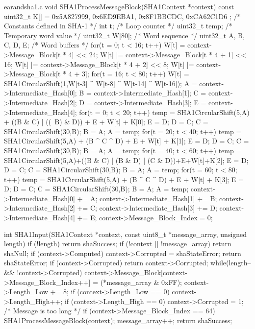 \begin{chunk}{earandsha1.c}
void SHA1ProcessMessageBlock(SHA1Context *context) {
  const uint32_t K[] = { 0x5A827999, 0x6ED9EBA1, 0x8F1BBCDC, 0xCA62C1D6 };
                              /* Constants defined in SHA-1  */
  int t;                      /* Loop counter                */
  uint32_t temp;              /* Temporary word value        */
  uint32_t W[80];             /* Word sequence               */
  uint32_t A, B, C, D, E;     /* Word buffers                */
  for(t = 0; t < 16; t++) {
    W[t] = context->Message_Block[t * 4] << 24;
    W[t] |= context->Message_Block[t * 4 + 1] << 16;
    W[t] |= context->Message_Block[t * 4 + 2] << 8;
    W[t] |= context->Message_Block[t * 4 + 3];
  }
  for(t = 16; t < 80; t++) {
    W[t] = SHA1CircularShift(1,W[t-3] ^ W[t-8] ^ W[t-14] ^ W[t-16]);
  }
  A = context->Intermediate_Hash[0];
  B = context->Intermediate_Hash[1];
  C = context->Intermediate_Hash[2];
  D = context->Intermediate_Hash[3];
  E = context->Intermediate_Hash[4];
  for(t = 0; t < 20; t++) {
    temp =  SHA1CircularShift(5,A) + ((B & C) | ((~B) & D)) + E + W[t] + K[0];
    E = D;
    D = C;
    C = SHA1CircularShift(30,B);
    B = A;
    A = temp;
  }
  for(t = 20; t < 40; t++) {
    temp = SHA1CircularShift(5,A) + (B ^ C ^ D) + E + W[t] + K[1];
    E = D;
    D = C;
    C = SHA1CircularShift(30,B);
    B = A;
    A = temp;
  }
  for(t = 40; t < 60; t++) {
    temp = SHA1CircularShift(5,A)+((B & C) | (B & D) | (C & D))+E+W[t]+K[2];
    E = D;
    D = C;
    C = SHA1CircularShift(30,B);
    B = A;
    A = temp;
  }
  for(t = 60; t < 80; t++) {
    temp = SHA1CircularShift(5,A) + (B ^ C ^ D) + E + W[t] + K[3];
    E = D;
    D = C;
    C = SHA1CircularShift(30,B);
    B = A;
    A = temp;
  }
  context->Intermediate_Hash[0] += A;
  context->Intermediate_Hash[1] += B;
  context->Intermediate_Hash[2] += C;
  context->Intermediate_Hash[3] += D;
  context->Intermediate_Hash[4] += E;
  context->Message_Block_Index = 0;
}

int SHA1Input(SHA1Context    *context,
              const uint8_t  *message_array,
              unsigned       length) {
  if (!length) {
    return shaSuccess;
  }
  if (!context || !message_array) {
    return shaNull;
  }
  if (context->Computed) {
    context->Corrupted = shaStateError;
    return shaStateError;
  }
  if (context->Corrupted) {
     return context->Corrupted;
  }
  while(length-- && !context->Corrupted) {
    context->Message_Block[context->Message_Block_Index++] =
                  (*message_array & 0xFF);
    context->Length_Low += 8;
    if (context->Length_Low == 0) {
      context->Length_High++;
      if (context->Length_High == 0) {
        context->Corrupted = 1;   /* Message is too long */
      }
    }
    if (context->Message_Block_Index == 64) {
      SHA1ProcessMessageBlock(context);
    }
    message_array++;
  }
  return shaSuccess;
}


\end{chunk}
